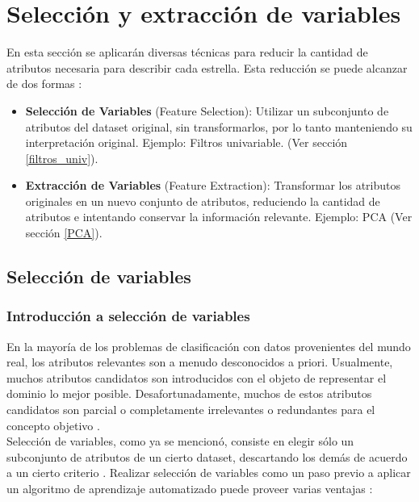 \chapter{Selección y extracción de variables}

En esta sección se aplicarán diversas técnicas para reducir la cantidad de atributos necesaria para describir cada estrella. Esta reducción se puede alcanzar de dos formas \cite{fs4}:

\begin{itemize}

\item \textbf{Selección de Variables} (Feature Selection): Utilizar un subconjunto de atributos del dataset original, sin transformarlos, por lo tanto manteniendo su interpretación original. Ejemplo: Filtros univariable. (Ver sección \ref{filtros_univ}).
\item \textbf{Extracción de Variables} (Feature Extraction): Transformar los atributos originales en un nuevo conjunto de atributos, reduciendo la cantidad de atributos e intentando conservar la información relevante. Ejemplo: PCA (Ver sección \ref{PCA}).
\end{itemize} 

\section{Selección de variables}
\subsection{Introducción a selección de variables}
\label{seleccion_v}


En la mayoría de los problemas de clasificación con datos provenientes del mundo real, los atributos relevantes son a menudo desconocidos a priori. Usualmente, muchos atributos candidatos son introducidos con el objeto de representar el dominio lo mejor posible. Desafortunadamente, muchos de estos atributos candidatos son parcial o completamente irrelevantes o redundantes para el concepto objetivo \cite{fs2}.  \\ 

Selección de variables, como ya se mencionó, consiste en elegir sólo un subconjunto de atributos de un cierto dataset, descartando los demás de acuerdo a un cierto criterio \cite{fs1}. Realizar selección de variables como un paso previo a aplicar un algoritmo de aprendizaje automatizado puede proveer varias ventajas \cite{fs3}:

